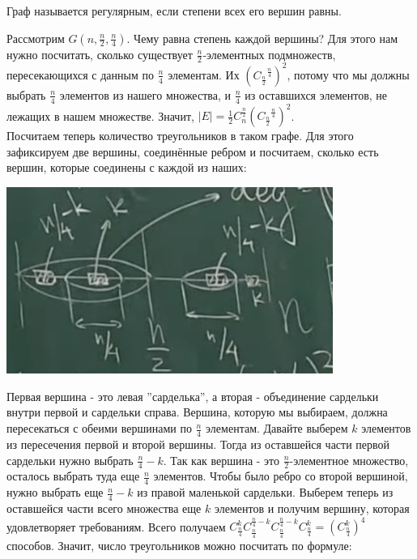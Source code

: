 \begin{definition}
    Граф называется регулярным, если степени всех его вершин равны.
\end{definition}

\begin{example}
Рассмотрим $G(n, \frac{n}{2}, \frac{n}{4})$.
Чему равна степень каждой вершины? Для этого нам нужно посчитать, сколько существует $\frac{n}{2}$-элементных подмножеств, пересекающихся с данным по $\frac{n}{4}$ элементам. Их ${({{C_{\frac{n}{2}}}^{\frac{n}{4}}})}^2$, потому что мы должны выбрать $\frac{n}{4}$ элементов из нашего множества, и $\frac{n}{4}$ из оставшихся элементов, не лежащих в нашем множестве. Значит, $|E| = \frac{1}{2}C_n^{\frac{n}{2}}{({{C_{\frac{n}{2}}}^{\frac{n}{4}}})}^2$.\\
Посчитаем теперь количество треугольников в таком графе. Для этого зафиксируем две вершины, соединённые ребром и посчитаем, сколько есть вершин, которые соединены с каждой из наших:

\includegraphics[width=0.8\textwidth]{images/lecture2_nrs.png}

Первая вершина - это левая ''сарделька'', а вторая - объединение сардельки внутри первой и сардельки справа. Вершина, которую мы выбираем, должна пересекаться с обеими вершинами по $\frac{n}{4}$ элементам. Давайте выберем $k$ элементов из пересечения первой и второй вершины. Тогда из оставшейся части первой сардельки нужно выбрать $\frac{n}{4} - k$. Так как вершина - это $\frac{n}{2}$-элементное множество, осталось выбрать туда еще $\frac{n}{4}$ элементов. Чтобы было ребро со второй вершиной, нужно выбрать еще $\frac{n}{4} - k$ из правой маленькой сардельки. Выберем теперь из оставшейся части всего множества еще $k$ элементов и получим вершину, которая удовлетворяет требованиям. Всего получаем $C_\frac{n}{4}^k C_\frac{n}{4}^{\frac{n}{4}-k} C_\frac{n}{4}^{\frac{n}{4}-k} C_\frac{n}{4}^{k} = (C_{\frac{n}{4}}^k)^4$ способов. Значит, число треугольников можно посчитать по формуле: 


\end{example}
